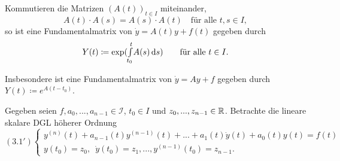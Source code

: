 \documentclass{cheat-sheet}
\begin{document}

\begin{satz}
  Kommutieren die Matrizen $(A(t))_{t \in I}$ miteinander, \dh{}
  \[ A(t) \cdot A(s) = A(s) \cdot A(t) \quad \text{für alle $t, s \in I$}, \]
  so ist eine Fundamentalmatrix von $\dot{y} = A(t) y + f(t)$ gegeben durch
  \[
    Y(t) \coloneqq \exp({\textstyle \int\limits_{t_0}^{t}} A(s) \,\mathrm{d} s)
    \qquad \text{für alle $t \in I$.}
  \]
\end{satz}

\begin{bem}
  Insbesondere ist eine Fundamentalmatrix von $\dot{y} = Ay + f$ gegeben durch $Y(t) \coloneqq e^{A (t - t_0)}$.
\end{bem}



\begin{prob}
  Gegeben seien $f, a_0, ..., a_{n-1} \in \mathcal{I}$, $t_0 \in I$ und $z_0, ..., z_{n-1} \in \mathbb{R}$. Betrachte die lineare skalare DGL höherer Ordnung
  \[
    (3.1') \left\{ \begin{array}{l}
      y^{(n)}(t) + a_{n-1}(t) y^{(n-1)}(t) + ... + a_1(t) \dot{y}(t) + a_0(t) y(t) = f(t)\\
      y(t_0) = z_0, \enspace \dot{y}(t_0) = z_1, ..., y^{(n-1)}(t_0) = z_{n-1}.
    \end{array} \right.
  \]
\end{prob}
\end{document}
